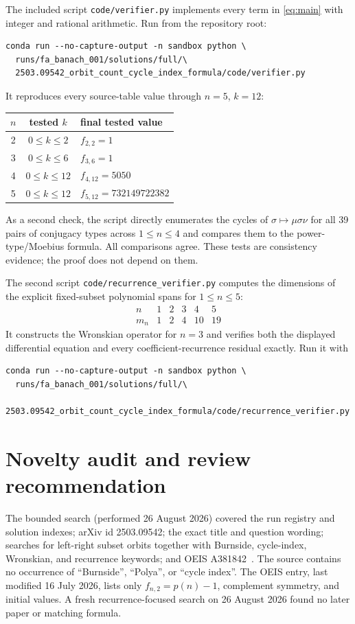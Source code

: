 \documentclass[11pt]{article}
\begin{document}
The included script \texttt{code/verifier.py} implements every term in
\eqref{eq:main} with integer and rational arithmetic. Run from the repository
root:
\begin{verbatim}
conda run --no-capture-output -n sandbox python \
  runs/fa_banach_001/solutions/full/\
  2503.09542_orbit_count_cycle_index_formula/code/verifier.py
\end{verbatim}
It reproduces every source-table value through $n=5$, $k=12$:
\begin{center}
\begin{tabular}{@{}ccl@{}}
\toprule
$n$ & tested $k$ & final tested value \\
\midrule
2 & $0\leq k\leq2$ & $f_{2,2}=1$ \\
3 & $0\leq k\leq6$ & $f_{3,6}=1$ \\
4 & $0\leq k\leq12$ & $f_{4,12}=5050$ \\
5 & $0\leq k\leq12$ & $f_{5,12}=732149722382$ \\
\bottomrule
\end{tabular}
\end{center}
As a second check, the script directly enumerates the cycles of
$\sigma\mapsto\mu\sigma\nu$ for all 39 pairs of conjugacy types across
$1\leq n\leq4$ and compares them to the power-type/Moebius formula. All
comparisons agree. These tests are consistency evidence; the proof does not
depend on them.

The second script \texttt{code/recurrence\_verifier.py} computes the
dimensions of the explicit fixed-subset polynomial spans for $1\leq n\leq5$:
\[
\begin{array}{c|ccccc}
n&1&2&3&4&5\\ \hline
m_n&1&2&4&10&19
\end{array}
\]
It constructs the Wronskian operator for $n=3$ and verifies both the displayed
differential equation and every coefficient-recurrence residual exactly.
Run it with
\begin{verbatim}
conda run --no-capture-output -n sandbox python \
  runs/fa_banach_001/solutions/full/\
  2503.09542_orbit_count_cycle_index_formula/code/recurrence_verifier.py
\end{verbatim}

\section{Novelty audit and review recommendation}

The bounded search (performed 26 August 2026) covered the run registry and
solution indexes; arXiv id 2503.09542; the exact title and question wording;
searches for left-right subset orbits together with Burnside, cycle-index,
Wronskian, and recurrence
keywords; and OEIS A381842~\cite{OEIS}. The source contains no occurrence of
``Burnside'', ``Polya'', or ``cycle index''. The OEIS entry, last modified
16 July 2026, lists only $f_{n,2}=p(n)-1$, complement symmetry, and initial
values. A fresh recurrence-focused search on 26 August 2026 found no later
paper or matching formula.
\end{document}
